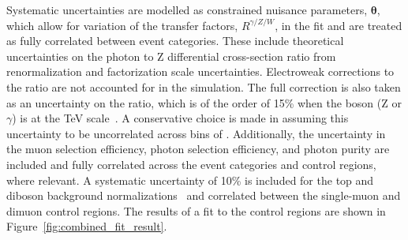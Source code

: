 Systematic uncertainties are modelled as constrained nuisance parameters, $\boldsymbol{\theta}$, which allow for variation of 
the transfer factors, $R^{\gamma/Z/W}$, in the fit and are treated as fully correlated between event categories.
These include theoretical uncertainties on the photon to Z differential cross-section ratio from renormalization and factorization scale uncertainties. 
Electroweak corrections to the ratio are not accounted for in the simulation. The full correction is also taken as an uncertainty on the ratio, 
which is of the order of 15\% when the boson (Z or $\gamma$) \pt is at the TeV scale~\cite{Kuhn:2005gv}. A conservative choice is made in assuming 
this uncertainty to be uncorrelated across bins of \ETm. Additionally, the uncertainty in the muon selection efficiency, photon selection efficiency, 
and photon purity are included and fully correlated across the event categories and control regions, where relevant. A systematic uncertainty of 10\% 
is included for the top and diboson background normalizations~\cite{tagkey2015250} and correlated between the single-muon and dimuon control regions. The results of a fit to the control regions are shown in Figure~\ref{fig:combined_fit_result}.
 

